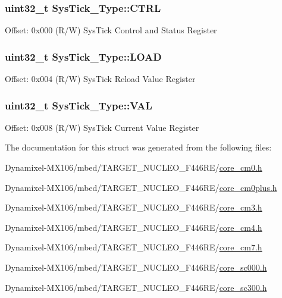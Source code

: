 \subsubsection[{\texorpdfstring{C\+T\+RL}{CTRL}}]{ uint32\+\_\+t Sys\+Tick\+\_\+\+Type\+::\+C\+T\+RL}\hypertarget{struct_sys_tick___type_af2ad94ac83e5d40fc6e34884bc1bec5f}{}\label{struct_sys_tick___type_af2ad94ac83e5d40fc6e34884bc1bec5f}
Offset\+: 0x000 (R/W) Sys\+Tick Control and Status Register 
\subsubsection[{\texorpdfstring{L\+O\+AD}{LOAD}}]{ uint32\+\_\+t Sys\+Tick\+\_\+\+Type\+::\+L\+O\+AD}\hypertarget{struct_sys_tick___type_ae7bc9d3eac1147f3bba8d73a8395644f}{}\label{struct_sys_tick___type_ae7bc9d3eac1147f3bba8d73a8395644f}
Offset\+: 0x004 (R/W) Sys\+Tick Reload Value Register 
\subsubsection[{\texorpdfstring{V\+AL}{VAL}}]{ uint32\+\_\+t Sys\+Tick\+\_\+\+Type\+::\+V\+AL}\hypertarget{struct_sys_tick___type_a0997ff20f11817f8246e8f0edac6f4e4}{}\label{struct_sys_tick___type_a0997ff20f11817f8246e8f0edac6f4e4}
Offset\+: 0x008 (R/W) Sys\+Tick Current Value Register 

The documentation for this struct was generated from the following files\+:\begin{DoxyCompactItemize}
\item 
Dynamixel-\/\+M\+X106/mbed/\+T\+A\+R\+G\+E\+T\+\_\+\+N\+U\+C\+L\+E\+O\+\_\+\+F446\+R\+E/\hyperlink{core__cm0_8h}{core\+\_\+cm0.\+h}\item 
Dynamixel-\/\+M\+X106/mbed/\+T\+A\+R\+G\+E\+T\+\_\+\+N\+U\+C\+L\+E\+O\+\_\+\+F446\+R\+E/\hyperlink{core__cm0plus_8h}{core\+\_\+cm0plus.\+h}\item 
Dynamixel-\/\+M\+X106/mbed/\+T\+A\+R\+G\+E\+T\+\_\+\+N\+U\+C\+L\+E\+O\+\_\+\+F446\+R\+E/\hyperlink{core__cm3_8h}{core\+\_\+cm3.\+h}\item 
Dynamixel-\/\+M\+X106/mbed/\+T\+A\+R\+G\+E\+T\+\_\+\+N\+U\+C\+L\+E\+O\+\_\+\+F446\+R\+E/\hyperlink{core__cm4_8h}{core\+\_\+cm4.\+h}\item 
Dynamixel-\/\+M\+X106/mbed/\+T\+A\+R\+G\+E\+T\+\_\+\+N\+U\+C\+L\+E\+O\+\_\+\+F446\+R\+E/\hyperlink{core__cm7_8h}{core\+\_\+cm7.\+h}\item 
Dynamixel-\/\+M\+X106/mbed/\+T\+A\+R\+G\+E\+T\+\_\+\+N\+U\+C\+L\+E\+O\+\_\+\+F446\+R\+E/\hyperlink{core__sc000_8h}{core\+\_\+sc000.\+h}\item 
Dynamixel-\/\+M\+X106/mbed/\+T\+A\+R\+G\+E\+T\+\_\+\+N\+U\+C\+L\+E\+O\+\_\+\+F446\+R\+E/\hyperlink{core__sc300_8h}{core\+\_\+sc300.\+h}\end{DoxyCompactItemize}
